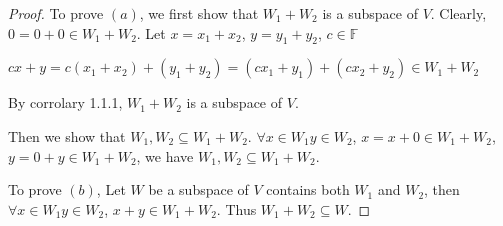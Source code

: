 \begin{proof}
	To prove $(a)$, we first show that $W_{1}+W_{2}$ is a subspace of $V$. Clearly, $0=0+0 \in W_{1}+W_{2}$. Let $x=x_{1}+x_{2}$, $y=y_{1}+y_{2}$, $c \in \mathbb{F}$

$cx+y=c(x_{1}+x_{2})+(y_{1}+y_{2})=(cx_{1}+y_{1})+(cx_{2}+y_{2}) \in W_{1}+W_{2}$

By corrolary 1.1.1, $W_{1}+W_{2}$ is a subspace of $V$.

Then we show that $W_{1}, W_{2} \subseteq W_{1}+W_{2}$. $\forall x \in W_{1} y \in W_{2}$, $x=x+0 \in W_{1}+W_{2}$, $y=0+y \in W_{1}+W_{2}$, we have $W_{1}, W_{2} \subseteq W_{1}+W_{2}$.

To prove $(b)$, Let $W$ be a subspace of $V$ contains both $W_{1}$ and $W_{2}$, then $\forall x \in W_{1} y \in W_{2}$, $x+y \in W_{1}+W_{2}$. Thus $W_{1}+W_{2} \subseteq W$. 
\end{proof}